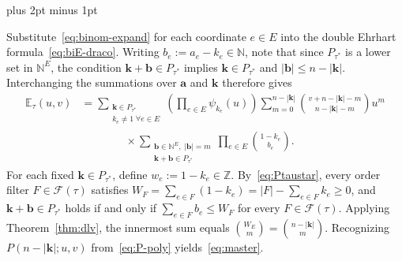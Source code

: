 \documentclass[11pt,letterpaper]{article}
\makeatletter
\renewenvironment{proof}[1][\proofname]{%
  \par\pushQED{\qed}\normalfont
  \topsep9pt plus 2pt minus 1pt\relax
  \trivlist\item[\hskip\labelsep\itshape #1\@addpunct{.}]\ignorespaces
}{\popQED\endtrivlist\@endpefalse}
\theoremstyle{result}
\theoremstyle{definition}
\theoremstyle{remark}
\newcommand{\NN}{\mathbb{N}}
\newcommand{\ZZ}{\mathbb{Z}}
\newcommand{\biE}{\mathbb{E}}
\newcommand{\fF}{\mathcal{F}}
\makeatother
\begin{document}
\begin{proof}[Proof of Theorem~\ref{thm:master}]
Substitute~\eqref{eq:binom-expand} for each coordinate $e\in E$ into the double Ehrhart formula~\eqref{eq:biE-draco}. Writing $b_e:=a_e-k_e\in\NN$, note that since $P_{\tau^*}$ is a lower set in $\NN^E$, the condition $\mathbf{k}+\mathbf{b}\in P_{\tau^*}$ implies $\mathbf{k}\in P_{\tau^*}$ and $|\mathbf{b}|\le n-|\mathbf{k}|$. Interchanging the summations over $\mathbf{a}$ and $\mathbf{k}$ therefore gives
\[
\begin{aligned}
\biE_\tau(u,v)
  &= \sum_{\substack{\mathbf{k}\in P_{\tau^*}\\ k_e\ne 1\;\forall e\in E}}
     \left(\prod_{e\in E}\psi_{k_e}(u)\right)
     \sum_{m=0}^{n-|\mathbf{k}|}\binom{v+n-|\mathbf{k}|-m}{n-|\mathbf{k}|-m} u^m\\
  &\qquad\qquad\mathord{}\times\sum_{\substack{\mathbf{b}\in\NN^E,\;|\mathbf{b}|=m\\
         \mathbf{k}+\mathbf{b}\in P_{\tau^*}}}
     \prod_{e\in E}\binom{1-k_e}{b_e}.
\end{aligned}
\]
For each fixed $\mathbf{k}\in P_{\tau^*}$, define $w_e:=1-k_e\in\ZZ$. By~\eqref{eq:Ptaustar}, every order filter $F\in\fF(\tau)$ satisfies $W_F=\sum_{e\in F}(1-k_e)=|F|-\sum_{e\in F}k_e\ge 0$, and $\mathbf{k}+\mathbf{b}\in P_{\tau^*}$ holds if and only if $\sum_{e\in F} b_e\le W_F$ for every $F\in\fF(\tau)$. Applying Theorem~\ref{thm:dlv}, the innermost sum equals $\binom{W_E}{m}=\binom{n-|\mathbf{k}|}{m}$. Recognizing $P(n-|\mathbf{k}|; u, v)$ from~\eqref{eq:P-poly} yields~\eqref{eq:master}.
\end{proof}
\end{document}
